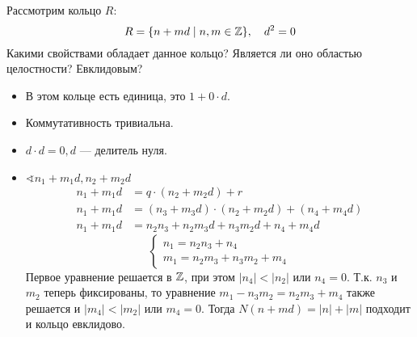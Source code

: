 \begin{exercise}
    Рассмотрим кольцо \(R\):
    \[R = \{n + md \mid n,m \in \mathbb{Z}\}, \quad d^2 = 0\]
    Какими свойствами обладает данное кольцо? Является ли оно областью целостности? Евклидовым?
\end{exercise}
\begin{solution}\itemfix
    \begin{itemize}
        \item В этом кольце есть единица, это \(1 + 0 \cdot d\).
        \item Коммутативность тривиальна.
        \item \(d \cdot d = 0, d\) --- делитель нуля.
        \item \(\sphericalangle n_1 + m_1d, n_2 + m_2d\)
              \begin{align*}
                  n_1 + m_1d & = q \cdot (n_2 + m_2d) + r                       \\
                  n_1 + m_1d & = (n_3 + m_3d) \cdot (n_2 + m_2d) + (n_4 + m_4d) \\
                  n_1 + m_1d & = n_2n_3 + n_2m_3d + n_3m_2d + n_4 + m_4d
              \end{align*}
              \[\begin{cases}
                      n_1 = n_2n_3 + n_4 \\
                      m_1 = n_2m_3 + n_3m_2 + m_4
                  \end{cases}\]
              Первое уравнение решается в \(\mathbb{Z}\), при этом \(|n_4| < |n_2|\) или \(n_4 = 0\). Т.к. \(n_3\) и \(m_2\) теперь фиксированы, то уравнение \(m_1 - n_3m_2 = n_2m_3 + m_4\) также решается и \(|m_4|< |m_2|\) или \(m_4 = 0\). Тогда \(N(n + md) = |n| + |m|\) подходит и кольцо евклидово.
    \end{itemize}
\end{solution}


